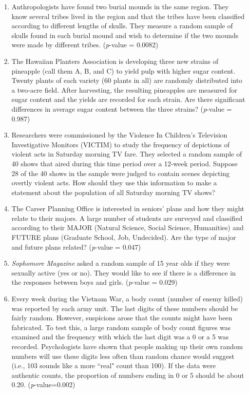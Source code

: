\renewcommand{\labelenumi}{\Alph{enumi}.}

\begin{enumerate}[leftmargin=1cm, itemsep=.2em]
\item Anthropologists have found two burial mounds in the same region. They know several tribes lived in the region and that the tribes have been classified according to different lengths of skulls. They measure a random sample of skulls found in each burial mound and wish to determine if the two mounds were made by different tribes.  (\textit{p}-value = 0.0082) 

\bigskip
	
\item The Hawaiian Planters Association is developing three new strains of pineapple (call them A, B, and C) to yield pulp with higher sugar content. Twenty plants of each variety (60 plants in all) are randomly distributed into a two-acre field. After harvesting, the resulting pineapples are measured for sugar content and the yields are recorded for each strain.  Are there significant differences in average sugar content between the three strains? (\textit{p}-value = 0.987)
\bigskip	
\item Researchers were commissioned by the Violence In Children's Television Investigative Monitors (VICTIM) to study the frequency of depictions of violent acts in Saturday morning TV fare.  They selected a random sample of 40 shows that aired during this time period over a 12-week period.  Suppose 28 of the 40 shows in the sample were judged to contain scenes depicting overtly violent acts.  How should they use this information to make a statement about the population of all Saturday morning TV shows?
\bigskip	
\item The Career Planning Office is interested in seniors' plans and how they might relate to their majors.  A large number of students are surveyed and classified according to their MAJOR (Natural Science, Social Science, Humanities) and FUTURE plans (Graduate School, Job, Undecided).  Are the type of major and future plans related?  (\textit{p}-value = 0.047)
\bigskip
\item \textit{Sophomore Magazine} asked a random sample of 15 year olds if they were sexually active (yes or no).  They would like to see if there is a difference in the responses between boys and girls.     (\textit{p}-value = 0.029)
\bigskip	
\item Every week during the Vietnam War, a body count (number of enemy killed) was reported by each army unit. The last digits of these numbers should be fairly random.  However, suspicions arose that the counts might have been fabricated.  To test this, a large random sample of body count figures was examined and the frequency with which the last digit was a 0 or a 5 was recorded.  Psychologists have shown that people making up their own random numbers will use these digits less often than random chance would suggest (i.e., 103 sounds like a more ``real" count than 100).  If the data were authentic counts, the proportion of numbers ending in 0 or 5 should be about 0.20.  (\textit{p}-value=0.002)

\end{enumerate}
